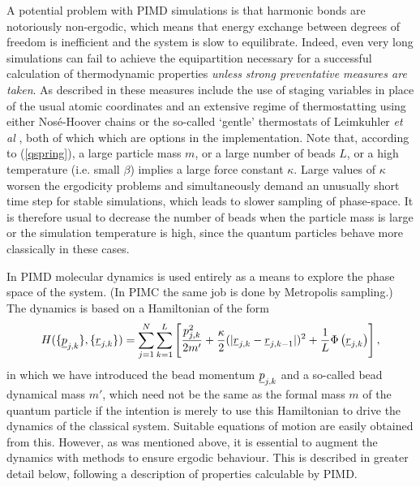 A potential problem with PIMD simulations is that harmonic bonds are
notoriously non-ergodic, which means that energy exchange between
degrees of freedom is inefficient and the system is slow to
equilibrate. Indeed, even very long simulations can fail to achieve
the equipartition necessary for a successful calculation of
thermodynamic properties {\em unless strong preventative measures are
  taken}.  As described in \cite{tuckerman-10} these measures include
the use of staging variables in place of the usual atomic coordinates
and an extensive regime of thermostatting using either Nos\'{e}-Hoover
chains \cite{martyna-92a,tuckerman-10} or the so-called `gentle'
thermostats of Leimkuhler {\em et al} \cite{leimkuhler-09a}, both of
which which are options in the \DD{} implementation.  Note that,
according to (\ref{qspring}), a large particle mass $m$, or a large
number of beads $L$, or a high temperature (i.e. small $\beta$)
implies a large force constant $\kappa$.  Large values of $\kappa$
worsen the ergodicity problems and simultaneously demand an unusually
short time step for stable simulations, which leads to slower sampling of
phase-space. It is therefore usual to decrease the number of beads
when the particle mass is large or the simulation temperature is high,
since the quantum particles behave more classically in these cases.

In PIMD molecular dynamics is used entirely as a means to explore the
phase space of the system. (In PIMC the same job is done by Metropolis
sampling.) The dynamics is based on a Hamiltonian of the form
\begin{equation}
H(\{\mbox{$\underline{p}$}_{j,k}\},\{\mbox{$\underline{r}$}_{j,k}\})=\sum_{j=1}^{N} \sum_{k=1}^{L}
\left [ \frac{p^{2}_{j,k}}{2m'}+ \frac{\kappa}{2}(|\mbox{$\underline{r}$}_{j,k}-\mbox{$\underline{
    r}$}_{j,k-1}| )^{2}+ \frac{1}{L} \Phi \left (\mbox{$\underline{ r}$}_{j,k} \right ) \right ], \label{qhamil}
\end{equation} 
in which we have introduced the bead momentum $\mbox{$\underline{p}$}_{j,k}$ and a
so-called bead dynamical mass $m'$, which need not be the same as the
formal mass $m$ of the quantum particle if the intention is merely to
use this Hamiltonian to drive the dynamics of the classical system.
Suitable equations of motion are easily obtained from this. However,
as was mentioned above, it is essential to augment the dynamics with
methods to ensure ergodic behaviour. This is described in greater
detail below, following a description of properties calculable by
PIMD.

